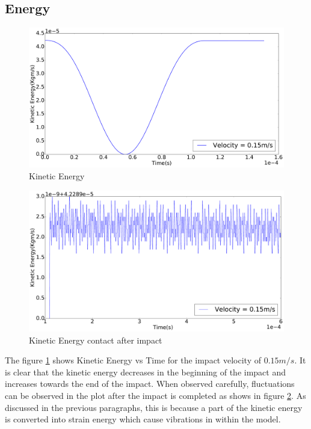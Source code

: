 \subsection{Energy}
\begin{figure}[H]
\includegraphics[width=1.0\textwidth]{../images/KE/KE_pdf.pdf}
\caption{Kinetic Energy}
\label{fig:KE}
\end{figure}
\begin{figure}[H]
\includegraphics[width=1.0\textwidth]{../images/KE/KEzoomed_pdf.pdf}
\caption{Kinetic Energy contact after impact}
\label{fig:KEzoomed}
\end{figure}
The figure \ref{fig:KE} shows Kinetic Energy vs Time for the impact velocity of $0.15m/s$. It is clear that the kinetic energy decreases in the beginning of the impact and increases towards the end of the impact. When observed carefully, fluctuations can be observed in the plot after the impact is completed as shows in figure \ref{fig:KEzoomed}. As discussed in the previous paragraphs, this is because a part of the kinetic energy is converted into strain energy which cause vibrations in within the model.

